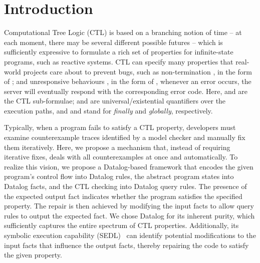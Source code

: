 \section{Introduction}
\label{sec:intro}

\vspace{-3mm}
Computational Tree Logic (CTL) is based on a branching notion of time -- at each moment, there may be several different possible futures -- which is sufficiently expressive to formulate a rich set of properties for infinite-state programs, such as reactive systems. 
CTL can specify many properties that real-world projects care about to prevent bugs, such as non-termination \cite{DBLP:conf/sigsoft/ShiXLZCL22}, in the form of ; and unresponsive behaviours \cite{DBLP:conf/icse/MengDLBR22}, in the form of , \eg whenever an error occurs, the server will eventually respond with the corresponding error code. 
Here,  and  are the CTL sub-formulae;  and  are universal/existential quantifiers over the execution paths, and  and  stand for \emph{finally} and \emph{globally}, respectively.  

Typically, when a program fails to satisfy a CTL property, developers must examine counterexample traces identified by a model checker and manually fix them iteratively. 
Here, we propose a mechanism that, instead of requiring iterative fixes, deals with all counterexamples at once and automatically. 
To realize this vision, we propose a Datalog-based framework that encodes the given program's control flow into Datalog rules, the abstract program states into Datalog facts, and the CTL checking into Datalog query rules.
The presence of the expected output fact indicates whether the program satisfies the specified property. 
The repair is then achieved by modifying the input facts to allow query rules to output the expected fact. 
We chose Datalog for its inherent purity, which sufficiently captures the entire spectrum of CTL properties. Additionally, its symbolic execution capability (SEDL)~\cite{DBLP:conf/sigsoft/LiuMSR23} can identify potential modifications to the input facts that influence the output facts, thereby repairing the code to satisfy the given property. 



